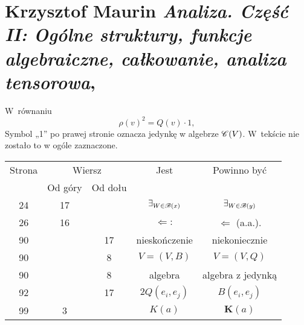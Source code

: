 \documentclass[a4paper,11pt]{article}
\numberwithin{equation}{section}
\begin{document}










\newpage

\section{Krzysztof Maurin \textit{Analiza. Część II: Ogólne
    struktury, funkcje algebraiczne, całkowanie, analiza
    tensorowa}, \cite{}}

\vspace{0em}



\vspace{0em}


\noindent
{} W~równaniu
\begin{equation}
  \label{eq:MaurinAnalizaOgolneStrukturyVolII-01}
  \rho( v )^{ 2 } = Q( v ) \cdot 1,
\end{equation}
Symbol „1” po prawej stronie oznacza jedynkę w algebrze $\mathcal{C}( V )$.
W~tekście nie zostało to w ogóle zaznaczone.





\newpage


\begin{center}

  \begin{tabular}{|c|c|c|c|c|}
    \hline
    Strona & \multicolumn{2}{c|}{Wiersz} & Jest
                              & Powinno być \\ \cline{2-3}
    & Od góry & Od dołu & & \\
    \hline
    24  & 17 & & $\exists_{ \substack{ W \in \mathcal{B}( x ) } }$
           & $\exists_{ \substack{ W \in \mathcal{B}( y ) } }$ \\
    26  & 16 & & $\Leftarrow:$ & $\Leftarrow$ (a.a.). \\
    90  & & 17 & nieskończenie & niekoniecznie \\
    90  & & \hphantom{0}8 & $V = ( V, B )$ & $V = ( V, Q )$ \\
    90  & & \hphantom{0}8 & algebra & algebra z jedynką \\
    92  & & 17 & $2Q( e_{ i }, e_{ j } )$ & $B( e_{ i }, e_{ j } )$ \\
    99  & \hphantom{0}3 & & $K( a )$ & $\mathbf{K}( a )$ \\
    \hline
  \end{tabular}

\end{center}
\end{document}
